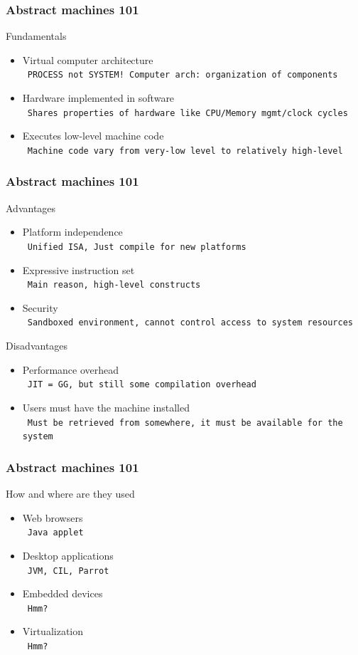\documentclass[handout]{beamer}
\newcommand{\n}[1]{\leavevmode\\~\texttt{\color{red}\tiny #1}}
\begin{document}
\begin{frame}
  \frametitle{Abstract machines 101}

  Fundamentals

  \begin{itemize}[<+->]
  \item Virtual computer architecture
    \n{PROCESS not SYSTEM! Computer arch: organization of components}
  \item Hardware implemented in software
    \n{Shares properties of hardware like CPU/Memory mgmt/clock cycles}
  \item Executes low-level machine code
    \n{Machine code vary from very-low level to relatively high-level}
  \end{itemize}

\end{frame}

\begin{frame}
  \frametitle{Abstract machines 101}

  Advantages
  \begin{itemize}[<+->]
  \item Platform independence
    \n{Unified ISA, Just compile for new platforms}
  \item Expressive instruction set
    \n{Main reason, high-level constructs}
  \item Security
    \n{Sandboxed environment, cannot control access to system resources}
  \end{itemize}

  Disadvantages
  \begin{itemize}[<+->]
  \item Performance overhead
    \n{JIT = GG, but still some compilation overhead}
  \item Users must have the machine installed
    \n{Must be retrieved from somewhere, it must be available for the system}
  \end{itemize}

\end{frame}

\begin{frame}
  \frametitle{Abstract machines 101}

  How and where are they used
  \begin{itemize}[<+->]
  \item Web browsers
    \n{Java applet}
  \item Desktop applications
    \n{JVM, CIL, Parrot}
  \item Embedded devices
    \n{Hmm?}
  \item Virtualization
    \n{Hmm?}
  \end{itemize}

\end{frame}
\end{document}
